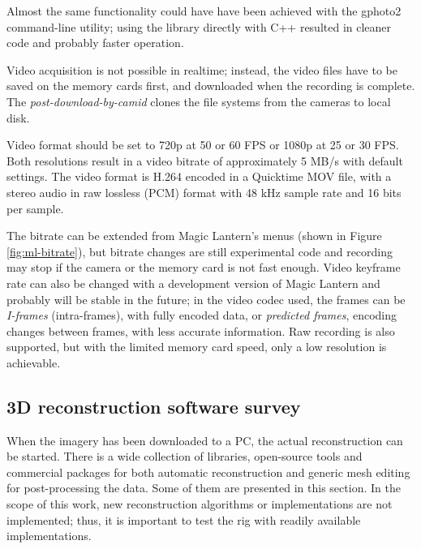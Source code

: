 Almost the same functionality could have have been achieved with the gphoto2 command-line utility; using the library directly with C++ resulted in cleaner code and probably faster operation.

Video acquisition is not possible in realtime; instead, the video files have to be saved on the memory cards first, and downloaded when the recording is complete.
The \emph{post-download-by-camid} clones the file systems from the cameras to local disk.

Video format should be set to 720p at 50 or 60 FPS or 1080p at 25 or 30 FPS.
Both resolutions result in a video bitrate of approximately 5 MB/s with default settings.
The video format is H.264 encoded in a Quicktime MOV file, with a stereo audio in raw lossless (PCM) format with 48 kHz sample rate and 16 bits per sample.

The bitrate can be extended from Magic Lantern's menus (shown in Figure \ref{fig:ml-bitrate}), but bitrate changes are still experimental code and recording may stop if the camera or the memory card is not fast enough.
Video keyframe rate can also be changed with a development version of Magic Lantern and probably will be stable in the future;
in the video codec used, the frames can be \emph{I-frames} (intra-frames), with fully encoded data, or \emph{predicted frames}, encoding changes between frames, with less accurate information.
Raw recording is also supported, but with the limited memory card speed, only a low resolution is achievable.



\subsection{3D reconstruction software survey} %


When the imagery has been downloaded to a PC, the actual reconstruction can be started.
There is a wide collection of libraries, open-source tools and commercial packages for both automatic reconstruction and generic mesh editing for post-processing the data.
Some of them are presented in this section.
In the scope of this work, new reconstruction algorithms or implementations are not implemented;
thus, it is important to test the rig with readily available implementations.

